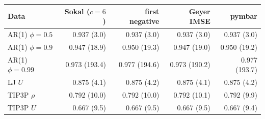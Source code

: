 \begin{tabular}{lrrrr}
\toprule
Data & Sokal ($c=6$) & first negative & Geyer IMSE & pymbar \\
\midrule
AR(1) $\phi=0.5$ & 0.937 (3.0) & 0.937 (3.0) & 0.937 (3.0) & 0.937 (3.0) \\
AR(1) $\phi=0.9$ & 0.947 (18.9) & 0.950 (19.3) & 0.947 (19.0) & 0.950 (19.2) \\
AR(1) $\phi=0.99$ & 0.973 (193.4) & 0.977 (194.6) & 0.973 (190.2) & 0.977 (193.7) \\
LJ $U$ & 0.875 (4.1) & 0.875 (4.2) & 0.875 (4.1) & 0.875 (4.2) \\
TIP3P $\rho$ & 0.792 (10.0) & 0.792 (10.0) & 0.792 (10.1) & 0.792 (9.9) \\
TIP3P $U$ & 0.667 (9.5) & 0.667 (9.5) & 0.667 (9.5) & 0.667 (9.4) \\
\bottomrule
\end{tabular}
